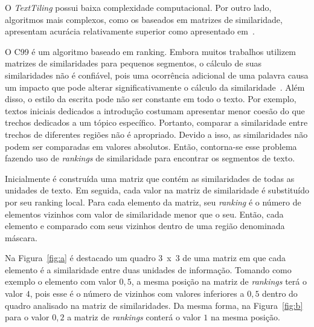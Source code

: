 O \textit{TextTiling} possui baixa complexidade computacional. Por outro lado, algoritmos mais complexos, como os baseados em matrizes de similaridade, apresentam acurácia relativamente superior como apresentado em~\cite{Choi2000, Kern2009, Misra2009}.





O C99 é um algoritmo baseado em ranking.
%
Embora muitos trabalhos utilizem matrizes de similaridades para pequenos segmentos, o cálculo de suas similaridades não é confiável, pois uma ocorrência adicional de uma palavra causa um impacto que pode alterar significativamente o cálculo da similaridade~\cite{Choi2000}.
%
Além disso, o estilo da escrita pode não ser constante em todo o texto. Por exemplo, textos iniciais dedicados a introdução costumam apresentar menor coesão do que trechos dedicados a um tópico específico. Portanto, comparar a similaridade entre trechos de diferentes regiões não é apropriado.
Devido a isso, as similaridades não podem ser comparadas em valores absolutos. Então, contorna-se esse problema fazendo uso de \textit{rankings} de similaridade para encontrar os segmentos de texto. 


Inicialmente é construída uma matriz que contém as similaridades de todas as unidades de texto. Em seguida, cada valor na matriz de similaridade é substituído por seu ranking local. Para cada elemento da matriz, seu \textit{ranking} é o número de elementos vizinhos com valor de similaridade menor que o seu.
Então, cada elemento e comparado com seus vizinhos dentro de uma região denominada máscara.
%

Na Figura~\ref{fig:a} é destacado um quadro 3~x~3 de uma matriz em que cada elemento é a similaridade entre duas unidades de informação. 
%
Tomando como exemplo o elemento com valor $0,5$, a mesma posição na matriz de \textit{rankings} terá o valor $4$, pois esse é o número de vizinhos com valores inferiores a $0,5$ dentro do quadro analisado na matriz de similaridades. Da mesma forma, na Figura~\ref{fig:b} para o valor $0,2$ a matriz de \textit{rankings} conterá o valor $1$ na mesma posição.





